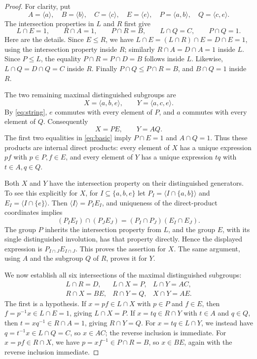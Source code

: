 \documentclass[11pt]{article}
\theoremstyle{remark}
\newcommand{\gen}[1]{\langle #1\rangle}
\begin{document}
\begin{proof}
For clarity, put
\[
 A=\gen a,\quad B=\gen b,\quad C=\gen c,\quad E=\gen e,
 \quad P=\gen{a,b},\quad Q=\gen{c,e}.
\]
The intersection properties in $L$ and $R$ first give
\begin{equation}\label{eq:basic}
 L\cap E=1,\qquad R\cap A=1,\qquad P\cap R=B,
 \qquad L\cap Q=C,
 \qquad P\cap Q=1.
\end{equation}
Here are the details. Since $E\leq R$, we have
$L\cap E=(L\cap R)\cap E=D\cap E=1$, using the intersection property
inside $R$; similarly $R\cap A=D\cap A=1$ inside $L$.
Since $P\leq L$, the equality
$P\cap R=P\cap D=B$ follows inside $L$.
Likewise, $L\cap Q=D\cap Q=C$ inside $R$.
Finally $P\cap Q\leq P\cap R=B$, and $B\cap Q=1$ inside $R$.

The two remaining maximal distinguished subgroups are
\[
 X=\gen{a,b,e},\qquad Y=\gen{a,c,e}.
\]
By \eqref{eq:string}, $e$ commutes with every element of $P$, and
$a$ commutes with every element of $Q$. Consequently
\[
 X=PE,\qquad Y=AQ.
\]
The first two equalities in \eqref{eq:basic} imply
$P\cap E=1$ and $A\cap Q=1$. Thus these products are internal direct
products: every element of $X$ has a unique expression $pf$ with
$p\in P,f\in E$, and every element of $Y$ has a unique expression $tq$
with $t\in A,q\in Q$.

Both $X$ and $Y$ have the intersection property on their distinguished
generators. To see this explicitly for $X$, for
$I\subseteq\{a,b,e\}$ let
$P_I=\gen{I\cap\{a,b\}}$ and $E_I=\gen{I\cap\{e\}}$.
Then $\gen I=P_IE_I$, and uniqueness of the direct-product coordinates
implies
\[
 (P_IE_I)\cap(P_JE_J)=(P_I\cap P_J)(E_I\cap E_J).
\]
The group $P$ inherits the intersection property from $L$, and the group
$E$, with its single distinguished involution, has that property directly.
Hence the displayed expression is $P_{I\cap J}E_{I\cap J}$.
This proves the assertion for $X$. The same argument, using $A$ and the
subgroup $Q$ of $R$, proves it for $Y$.

We now establish all six intersections of the maximal distinguished
subgroups:
\begin{equation}\label{eq:six}
\begin{array}{lll}
 L\cap R=D,&L\cap X=P,&L\cap Y=AC,\\[2pt]
 R\cap X=BE,&R\cap Y=Q,&X\cap Y=AE.
\end{array}
\end{equation}
The first is a hypothesis. If $x=pf\in L\cap X$ with $p\in P$ and
$f\in E$, then $f=p^{-1}x\in L\cap E=1$, giving $L\cap X=P$.
If $x=tq\in R\cap Y$ with $t\in A$ and $q\in Q$, then
$t=xq^{-1}\in R\cap A=1$, giving $R\cap Y=Q$.
For $x=tq\in L\cap Y$, we instead have $q=t^{-1}x\in L\cap Q=C$,
so $x\in AC$; the reverse inclusion is immediate.
For $x=pf\in R\cap X$, we have $p=xf^{-1}\in P\cap R=B$,
so $x\in BE$, again with the reverse inclusion immediate.


\end{proof}
\end{document}
